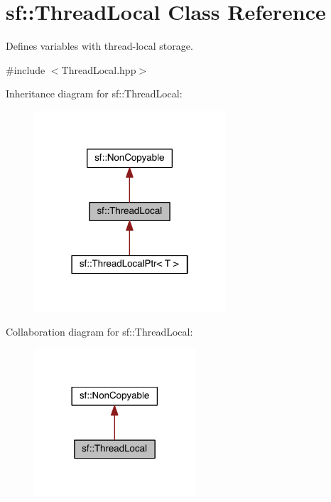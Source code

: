 \hypertarget{classsf_1_1_thread_local}{\section{sf\-:\-:Thread\-Local Class Reference}
\label{classsf_1_1_thread_local}
}


Defines variables with thread-\/local storage.  




{\ttfamily \#include $<$Thread\-Local.\-hpp$>$}



Inheritance diagram for sf\-:\-:Thread\-Local\-:
\nopagebreak
\begin{figure}[H]
\begin{center}
\leavevmode
\includegraphics[width=202pt]{classsf_1_1_thread_local__inherit__graph}
\end{center}
\end{figure}


Collaboration diagram for sf\-:\-:Thread\-Local\-:
\nopagebreak
\begin{figure}[H]
\begin{center}
\leavevmode
\includegraphics[width=170pt]{classsf_1_1_thread_local__coll__graph}
\end{center}
\end{figure}
